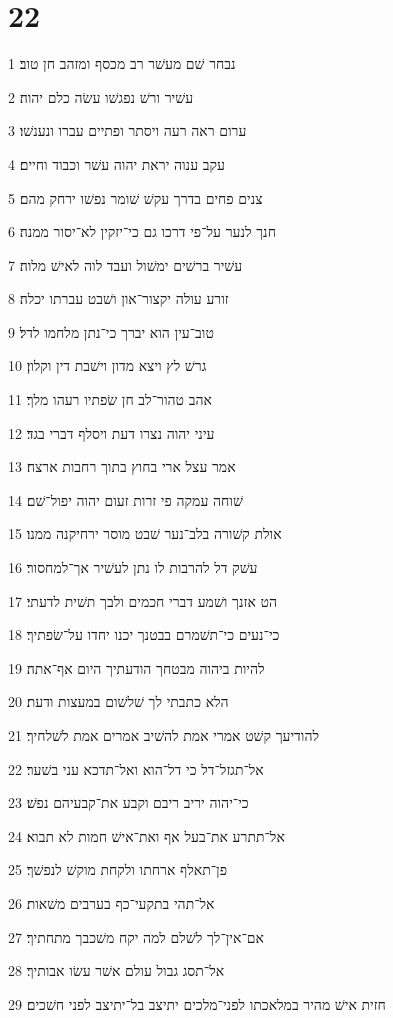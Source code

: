 \chapter{22}

\par 1 נבחר שׁם מעשׁר רב מכסף ומזהב חן טוב׃
\par 2 עשׁיר ורשׁ נפגשׁו עשׂה כלם יהוה׃
\par 3 ערום ראה רעה ויסתר ופתיים עברו ונענשׁו׃
\par 4 עקב ענוה יראת יהוה עשׁר וכבוד וחיים׃
\par 5 צנים פחים בדרך עקשׁ שׁומר נפשׁו ירחק מהם׃
\par 6 חנך לנער על־פי דרכו גם כי־יזקין לא־יסור ממנה׃
\par 7 עשׁיר ברשׁים ימשׁול ועבד לוה לאישׁ מלוה׃
\par 8 זורע עולה יקצור־און ושׁבט עברתו יכלה׃
\par 9 טוב־עין הוא יברך כי־נתן מלחמו לדל׃
\par 10 גרשׁ לץ ויצא מדון וישׁבת דין וקלון׃
\par 11 אהב טהור־לב חן שׂפתיו רעהו מלך׃
\par 12 עיני יהוה נצרו דעת ויסלף דברי בגד׃
\par 13 אמר עצל ארי בחוץ בתוך רחבות ארצח׃
\par 14 שׁוחה עמקה פי זרות זעום יהוה יפול־שׁם׃
\par 15 אולת קשׁורה בלב־נער שׁבט מוסר ירחיקנה ממנו׃
\par 16 עשׁק דל להרבות לו נתן לעשׁיר אך־למחסור׃
\par 17 הט אזנך ושׁמע דברי חכמים ולבך תשׁית לדעתי׃
\par 18 כי־נעים כי־תשׁמרם בבטנך יכנו יחדו על־שׂפתיך׃
\par 19 להיות ביהוה מבטחך הודעתיך היום אף־אתה׃
\par 20 הלא כתבתי לך שׁלשׁום במעצות ודעת׃
\par 21 להודיעך קשׁט אמרי אמת להשׁיב אמרים אמת לשׁלחיך׃
\par 22 אל־תגזל־דל כי דל־הוא ואל־תדכא עני בשׁער׃
\par 23 כי־יהוה יריב ריבם וקבע את־קבעיהם נפשׁ׃
\par 24 אל־תתרע את־בעל אף ואת־אישׁ חמות לא תבוא׃
\par 25 פן־תאלף ארחתו ולקחת מוקשׁ לנפשׁך׃
\par 26 אל־תהי בתקעי־כף בערבים משׁאות׃
\par 27 אם־אין־לך לשׁלם למה יקח משׁכבך מתחתיך׃
\par 28 אל־תסג גבול עולם אשׁר עשׂו אבותיך׃
\par 29 חזית אישׁ מהיר במלאכתו לפני־מלכים יתיצב בל־יתיצב לפני חשׁכים׃

